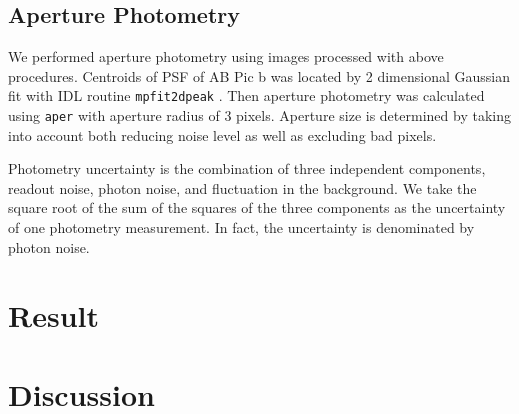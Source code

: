 \documentclass[apj]{emulateapj}
\begin{document}
\subsection{Aperture Photometry}

We performed aperture photometry using images processed with above
procedures.  Centroids of PSF of AB Pic b was located by 2 dimensional
Gaussian fit with IDL routine \texttt{mpfit2dpeak}
\citep{Markwardt2009}. Then aperture photometry was calculated using
\texttt{aper} with aperture radius of 3 pixels. Aperture size is
determined by taking into account both reducing noise level as well as
excluding bad pixels.

Photometry uncertainty is the combination of three independent components, readout
noise, photon noise, and fluctuation in the background. We take the
square root of the sum of the squares of the three components as the
uncertainty of one photometry measurement. In fact, the uncertainty is
denominated by photon noise.
\section{Result}
\section{Discussion}

\end{document}
